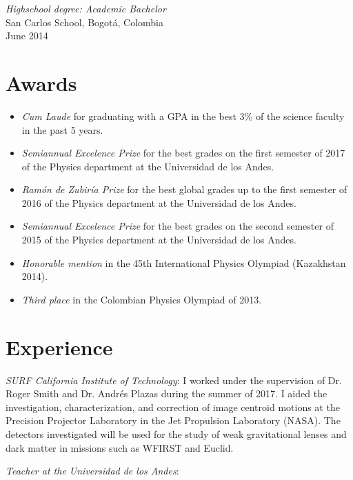 \documentclass[line,margin]{res}
\begin{document}
\begin{resume}
{\sl Highschool degree: Academic Bachelor} \\
San Carlos School, Bogotá, Colombia \\
June 2014

\section{Awards}

\begin{itemize}

\item{\sl Cum Laude} for graduating with a GPA in the best 3\% of the science faculty in the past 5 years. 

\item {\sl Semiannual Excelence Prize} for the best grades on the first semester of 2017 of the Physics department at the Universidad de los Andes.

\item {\sl Ramón de Zubiría Prize} for the best global grades up to the first semester of 2016 of the Physics department at the Universidad de los Andes.

\item {\sl Semiannual Excelence Prize} for the best grades on the second semester of 2015 of the Physics department at the Universidad de los Andes.

\item {\sl Honorable mention} in the 45th International Physics Olympiad (Kazakhstan 2014).

\item {\sl Third place} in the Colombian Physics Olympiad of 2013.

\end{itemize}

\section{Experience}

{\sl SURF California Institute of Technology}: I worked under the supervision of Dr. Roger Smith and Dr. Andrés Plazas during the summer of 2017. I aided the investigation, characterization, and correction of image centroid motions at the Precision Projector Laboratory in the Jet Propulsion Laboratory (NASA). The detectors investigated will be used for the study of weak gravitational lenses and dark matter in missions such as WFIRST and Euclid.

{\sl Teacher at the Universidad de los Andes}:
\begin{itemize}


\end{itemize}
\end{resume}
\end{document}
